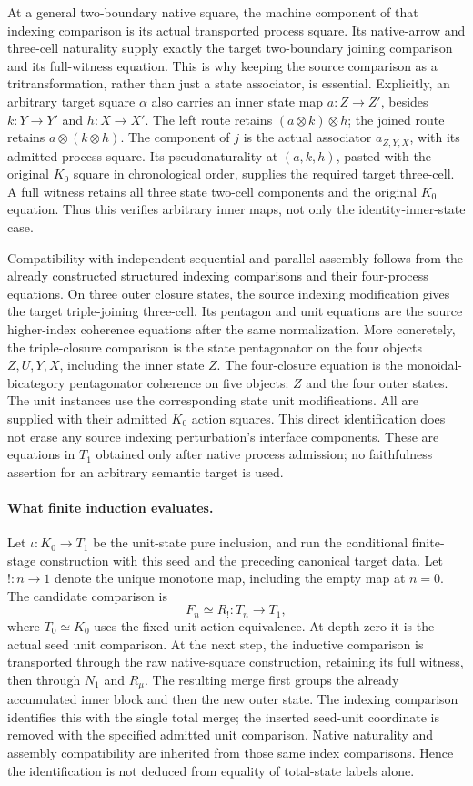 \documentclass{article}
\begin{document}
At a general two-boundary native square, the machine component of that indexing comparison is its actual transported process square. Its native-arrow and three-cell naturality supply exactly the target two-boundary joining comparison and its full-witness equation. This is why keeping the source comparison as a tritransformation, rather than just a state associator, is essential. Explicitly, an arbitrary target square $\alpha$ also carries an inner state map $a:Z\to Z'$, besides $k:Y\to Y'$ and $h:X\to X'$. The left route retains $(a\otimes k)\otimes h$; the joined route retains $a\otimes(k\otimes h)$. The component of $j$ is the actual associator $a_{Z,Y,X}$, with its admitted process square. Its pseudonaturality at $(a,k,h)$, pasted with the original $K_0$ square in chronological order, supplies the required target three-cell. A full witness retains all three state two-cell components and the original $K_0$ equation. Thus this verifies arbitrary inner maps, not only the identity-inner-state case.

Compatibility with independent sequential and parallel assembly follows from the already constructed structured indexing comparisons and their four-process equations. On three outer closure states, the source indexing modification gives the target triple-joining three-cell. Its pentagon and unit equations are the source higher-index coherence equations after the same normalization. More concretely, the triple-closure comparison is the state pentagonator on the four objects $Z,U,Y,X$, including the inner state $Z$. The four-closure equation is the monoidal-bicategory pentagonator coherence on five objects: $Z$ and the four outer states. The unit instances use the corresponding state unit modifications. All are supplied with their admitted $K_0$ action squares. This direct identification does not erase any source indexing perturbation's interface components. These are equations in $T_1$ obtained only after native process admission; no faithfulness assertion for an arbitrary semantic target is used.

\paragraph{What finite induction evaluates.} Let $\iota:K_0\to T_1$ be the unit-state pure inclusion, and run the conditional finite-stage construction with this seed and the preceding canonical target data. Let $!:n\to1$ denote the unique monotone map, including the empty map at $n=0$. The candidate comparison is
\[
 F_n\simeq R_!:T_n\to T_1,
\]
where $T_0\simeq K_0$ uses the fixed unit-action equivalence. At depth zero it is the actual seed unit comparison. At the next step, the inductive comparison is transported through the raw native-square construction, retaining its full witness, then through $N_1$ and $R_\mu$. The resulting merge first groups the already accumulated inner block and then the new outer state. The indexing comparison identifies this with the single total merge; the inserted seed-unit coordinate is removed with the specified admitted unit comparison. Native naturality and assembly compatibility are inherited from those same index comparisons. Hence the identification is not deduced from equality of total-state labels alone.
\end{document}
